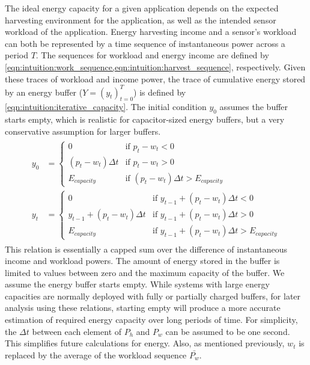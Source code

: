 The ideal energy capacity for a given application depends on the 
expected harvesting environment for the application,
as well as the 
intended sensor workload of the application. 
Energy harvesting income and a sensor's workload can both be represented by a time sequence of instantaneous power across a period $T$.
The sequences for workload and energy income are defined by \cref{eqn:intuition:work_sequence,eqn:intuition:harvest_sequence}, respectively.
Given these traces of workload and income power, the trace of cumulative energy stored by an energy buffer ($Y = (y_t)^T_{t=0}$) is defined by \cref{eqn:intuition:iterative_capacity}. The initial condition $y_0$ assumes the buffer starts empty, which is realistic for capacitor-sized energy buffers, but a very conservative assumption for larger buffers. 
\begin{align}
\begin{split}
    y_0 &= \begin{cases} 
        0                       & \text{if $p_t - w_t < 0$} \\
        (p_t - w_t) \Delta t    & \text{if $p_t - w_t > 0$} \\
        E_{capacity}            & \text{if $(p_t - w_t) \Delta t > E_{capacity}$}
    \end{cases} \\
    y_t &= \begin{cases} 
        0                               & \text{if $y_{t-1} + (p_t - w_t) \Delta t < 0$} \\
        y_{t-1} + (p_t - w_t) \Delta t  & \text{if $y_{t-1} + (p_t - w_t) \Delta t > 0$} \\
        E_{capacity}                    & \text{if $y_{t-1} + (p_t - w_t) \Delta t > E_{capacity}$}
    \end{cases}
    \end{split} \label{eqn:intuition:iterative_capacity} 
\end{align}
This relation is essentially a capped sum over the difference of instantaneous income and workload powers. The amount of energy stored in the buffer is limited to values between zero and the maximum capacity of the buffer. 
We assume the energy buffer starts empty.
While systems with large energy capacities are normally deployed with fully or partially charged buffers,
for later analysis using these relations, starting empty will produce a more accurate estimation of required energy capacity over long periods of time.
For simplicity, the $\Delta t$ between each element of $P_h$ and $P_w$ can be assumed to be one second. This simplifies future calculations for energy. Also, as mentioned previously, $w_t$ is replaced by the average of the workload sequence $\bar{P_w}$.

